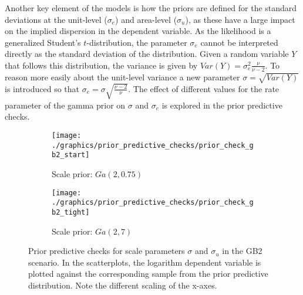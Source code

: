 Another key element of the models is how the priors are defined for the standard deviations at the unit-level ($\sigma_e$) and area-level ($\sigma_u$), as these have a large impact on the implied dispersion in the dependent variable.
As the likelihood is a generalized Student's $t$-distribution, the parameter $\sigma_e$ cannot be interpreted directly as the standard deviation of the distribution.
Given a random variable $Y$ that follows this distribution, the variance is given by $Var(Y) = \sigma_e^2 \frac{\nu}{\nu - 2}$.
To reason more easily about the unit-level variance a new parameter $\sigma = \sqrt{Var(Y)}$ is introduced so that $\sigma_e = \sigma \sqrt{\frac{\nu - 2}{\nu}}$.
The effect of different values for the rate parameter of the gamma prior on $\sigma$ and $\sigma_e$ is explored in the prior predictive checks.

\begin{figure}

    \begin{subfigure}{\linewidth}
        \centering
        \texttt{[image: ./graphics/prior\_predictive\_checks/prior\_check\_gb2\_start]}
        \caption{Scale prior: $Ga(2, 0.75)$}
        \label{fig:ppc_start}
    \end{subfigure}


    \begin{subfigure}{\linewidth}
        \centering
        \texttt{[image: ./graphics/prior\_predictive\_checks/prior\_check\_gb2\_tight]}
        \caption{Scale prior: $Ga(2, 7)$}
        \label{fig:ppc_tight}
    \end{subfigure}
    \caption[Prior predictive checks for scale parameters in the GB2 scenario.]{Prior predictive checks for scale parameters $\sigma$ and $\sigma_u$ in the GB2 scenario. In the scatterplots, the logarithm dependent variable is plotted against the corresponding sample from the prior predictive distribution. Note the different scaling of the x-axes.}
    \label{fig:prior_pred_variance}
\end{figure}

